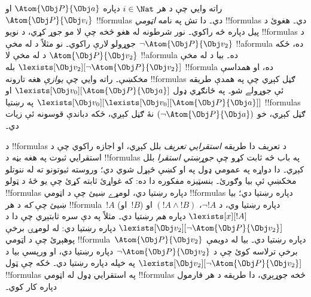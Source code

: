 \documentclass[../../../include/open-logic-section]{subfiles}
\begin{document}
 راته وايي چې د هر $i \in \Nat$ دپاره
$\Atom{\Obj P}{\Obj a}$ او $\Atom{\Obj P}{\Obj v_i}$
!!{formula}s دي۔ دا تش په نامه \emph{اټومي} !!{formula}s دي۔ هغوئ
د پيل دپاره څه راکوي۔ نور شرطونه له هغو څخه چې لا مو
جوړ کړي، د نويو !!{formula}s د جوړولو لارې راکوي۔ نو مثلاً د
 له مخې $\lnot \Atom{\Obj P}{\Obj v_2}$
!!a{formula} ده، ځکه $\Atom{\Obj P}{\Obj v_2}$ د
 له مخې لا !!a{formula} ده۔ بيا د
 له مخې $\lexists[\Obj v_2][\lnot \Atom{\Obj P}{\Obj v_2}]$
بله !!{formula} ده، او همداسې مخکښې۔  راته وايي
چې \emph{يوازې} هغه تارونه !!{formula}s ګڼل کېږي چې په همدې طريقه
ئې جوړولے شو۔ په ځانګړي ډول
$\lexists[\Obj v_0][\Atom{\Obj P}{\Obj a}]$ او
$\lexists[\Obj v_0][\lexists[\Obj v_0][\Atom{\Obj P}{\Obj a}]]$
په رښتيا !!{formula}s ګڼل کېږي، خو $(\lnot \Atom{\Obj P}{\Obj a})$
نۀ ګڼل کېږي، ځکه دباندې قوسونه ئې زيات دي۔

د !!{formula}s د تعريف دا طريقه \emph{استقرايي تعريف} بلل کېږي،
او اجازه راکوي چې د استقرايي ثبوت په هغه بڼه د !!{formula}s په باب
څه ثابت کړو چې \emph{جوړښتي استقرا} بلل کېږي۔ دا دواړه په عمومي
ډول په  او 
کښې څېړل شوي دي؛ وروسته ثبوتونو ته له ننوتلو مخکښې ئې بيا وګورئ۔
بنسټيزه مفکوره دا ده: که غواړئ ثابته کړئ چې يو څۀ د ټولو
!!{formula}s دپاره رښتيا دي، لومړے ښيئ چې د اټومي !!{formula}s
دپاره رښتيا دي؛ بيا ښيئ چې \emph{که} د هر !!{formula}~$!A$
(او~$!B$) دپاره رښتيا وي، د $\lnot !A$، $(!A \land !B)$ او
$\lexists[x][!A]$ دپاره \emph{هم} رښتيا دي۔ مثلاً په دې سره ثابتېږي
چې دا د $\lexists[\Obj v_2][\lnot \Atom{\Obj P}{\Obj v_2}]$ دپاره
رښتيا دي: له لومړۍ برخې پوهېږئ چې د اټومي
!!{formula}~$\Atom{\Obj P}{\Obj v_2}$ دپاره رښتيا دي۔ بيا له دويمې
برخې ترلاسه کوئ چې د $\lnot \Atom{\Obj P}{\Obj v_2}$ دپاره رښتيا
دي، او ورپسې بيا د $\lexists[\Obj v_2][\lnot \Atom{\Obj P}{\Obj v_2}]$
په خپله دپاره رښتيا دي۔ ځکه چې ټول !!{formula}s په استقرايي ډول له
اټومي !!{formula}s څخه جوړېږي، دا طريقه د هر فارمول دپاره کار کوي۔
\end{document}

